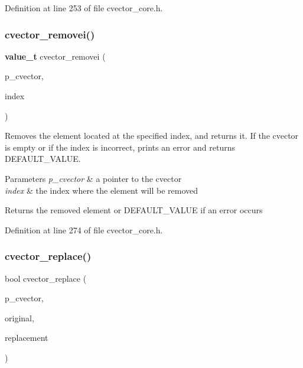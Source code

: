 Definition at line 253 of file cvector\+\_\+core.\+h.

\mbox{\label{cvector__core_8h_aa10fda3704501241f975de8789dc5d9c}} 
\subsubsection{cvector\+\_\+removei()}
{\footnotesize\ttfamily \textbf{ value\+\_\+t} cvector\+\_\+removei (\begin{DoxyParamCaption}\item[{\textbf{ cvector} $\ast$}]{p\+\_\+cvector,  }\item[{\textbf{ index\+\_\+t}}]{index }\end{DoxyParamCaption})}

Removes the element located at the specified index, and returns it. If the cvector is empty or if the index is incorrect, prints an error and returns D\+E\+F\+A\+U\+L\+T\+\_\+\+V\+A\+L\+UE. 
\begin{DoxyParams}{Parameters}
{\em p\+\_\+cvector} & a pointer to the cvector \\
\hline
{\em index} & the index where the element will be removed \\
\hline
\end{DoxyParams}
\begin{DoxyReturn}{Returns}
the removed element or D\+E\+F\+A\+U\+L\+T\+\_\+\+V\+A\+L\+UE if an error occurs 
\end{DoxyReturn}


Definition at line 274 of file cvector\+\_\+core.\+h.

\mbox{\label{cvector__core_8h_a3d72487e7685f7ab93fda40cabb60958}} 
\subsubsection{cvector\+\_\+replace()}
{\footnotesize\ttfamily bool cvector\+\_\+replace (\begin{DoxyParamCaption}\item[{\textbf{ cvector} $\ast$}]{p\+\_\+cvector,  }\item[{\textbf{ value\+\_\+t}}]{original,  }\item[{\textbf{ value\+\_\+t}}]{replacement }\end{DoxyParamCaption})}


